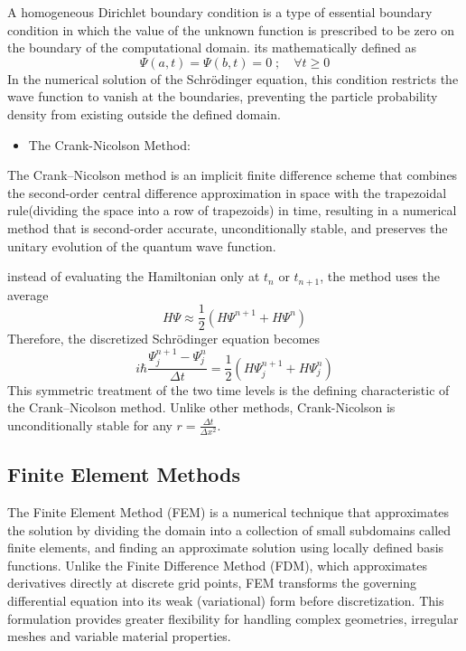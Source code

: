 \documentclass[11pt]{article}
\begin{document}
A homogeneous Dirichlet boundary condition is a type of essential boundary condition in which the value of the unknown function is prescribed to be zero on the boundary of the computational domain. its mathematically defined as
\begin{equation}
	\Psi(a,t) = \Psi(b,t) = 0 \; ; \quad \forall t \geq 0
\end{equation}
 In the numerical solution of the Schrödinger equation, this condition restricts the wave function to vanish at the boundaries, preventing the particle probability density from existing outside the defined domain.
 
\begin{itemize}
	\item 
	The Crank-Nicolson Method:
\end{itemize}
The Crank–Nicolson method is an implicit finite difference scheme that combines the second-order central difference approximation in space with the trapezoidal rule(dividing the space into a row of trapezoids) in time, resulting in a numerical method that is second-order accurate, unconditionally stable, and preserves the unitary evolution of the quantum wave function.

instead of evaluating the Hamiltonian only at $t_n$ or $t_{n+1}$, the method uses the average
\begin{equation}
	H \Psi \approx \frac{1}{2} \left( H \Psi^{n+1} + H \Psi^n \right)
\end{equation}
Therefore, the discretized Schrödinger equation becomes
\begin{equation}
	i \hbar \frac{\Psi_j^{n+1}-\Psi_j^n}{\Delta t} = \frac{1}{2} \left( H \Psi_j^{n+1} + H \Psi_j^n \right)
\end{equation}
This symmetric treatment of the two time levels is the defining characteristic of the Crank–Nicolson method. Unlike other methods, Crank-Nicolson is unconditionally stable for any $r = \frac{\Delta t}{\Delta x^2}$.

\subsection{Finite Element Methods}
The Finite Element Method (FEM) is a numerical technique that approximates the solution by dividing the domain into a collection of small subdomains called finite elements, and finding an approximate solution using locally defined basis functions. Unlike the Finite Difference Method (FDM), which approximates derivatives directly at discrete grid points, FEM transforms the governing differential equation into its weak (variational) form before discretization. This formulation provides greater flexibility for handling complex geometries, irregular meshes and variable material properties.
\end{document}
